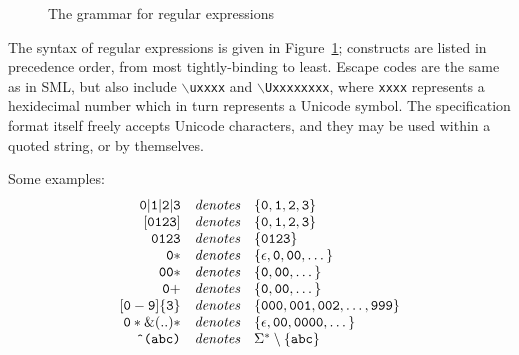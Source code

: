 \begin{figure}
\caption{The \ulex{} grammar for regular expressions}\label{ulex-rule-syntax}
\end{figure}

The syntax of regular expressions is given in Figure~\ref{ulex-rule-syntax}; constructs are listed in precedence order, from most tightly-binding to least.  Escape codes are the same as in SML, but also include \texttt{$\backslash$uxxxx} and \texttt{$\backslash$Uxxxxxxxx}, where \texttt{xxxx} represents a hexidecimal number which in turn represents a Unicode symbol.  The specification format itself freely accepts Unicode characters, and they may be used within a quoted string, or by themselves.

Some examples:
\[
\begin{array}{rcl}
{\tt 0 | 1 | 2 | 3}	& \textit{denotes} &
    \{ \texttt{0}, \texttt{1}, \texttt{2}, \texttt{3} \}	\\
{\tt [0123]}	& \textit{denotes} &
    \{ \texttt{0}, \texttt{1}, \texttt{2}, \texttt{3} \}	\\
{\tt 0123}	& \textit{denotes} &
    \{ \texttt{0123} \}						\\
{\tt 0*}	& \textit{denotes} &
    \{ \epsilon, \texttt{0}, \texttt{00}, \dots \}		\\
{\tt 00*}	& \textit{denotes} &
    \{ \texttt{0}, \texttt{00}, \dots \}		\\
{\tt 0+}	& \textit{denotes} &
    \{ \texttt{0}, \texttt{00}, \dots \}		\\
{\tt [0-9]\{3\}}	& \textit{denotes} &
    \{ \texttt{000}, \texttt{001}, \texttt{002}, \dots, \texttt{999} \}	\\
{\tt 0* \& (..)*}	& \textit{denotes} &
    \{ \epsilon, \texttt{00}, \texttt{0000}, \dots \}	\\
\texttt{\^{ }(abc)}	& \textit{denotes} &
    \Sigma^* \setminus \{ \texttt{abc} \}
\end{array}
\]

